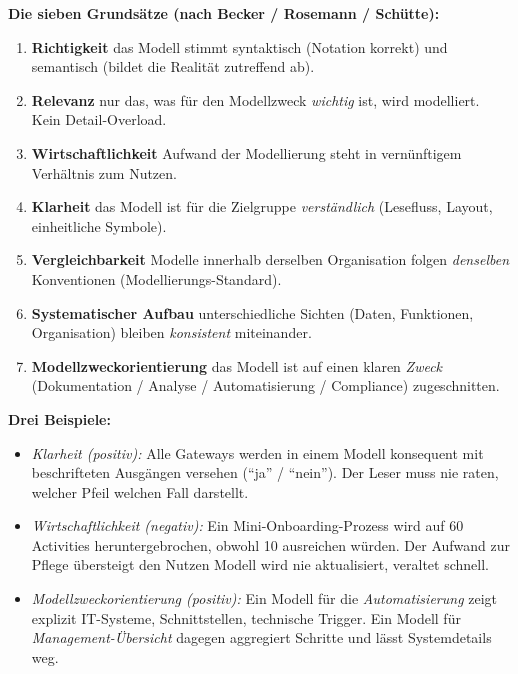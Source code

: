 \documentclass[11pt,a4paper,oneside]{article}
\begin{document}
\begin{loesungbox}
\textbf{Die sieben Grunds\"atze (nach Becker / Rosemann / Sch\"utte):}

\begin{enumerate}
  \item \textbf{Richtigkeit} \textendash{} das Modell stimmt syntaktisch (Notation korrekt) und semantisch (bildet die Realit\"at zutreffend ab).
  \item \textbf{Relevanz} \textendash{} nur das, was f\"ur den Modellzweck \emph{wichtig} ist, wird modelliert. Kein Detail-Overload.
  \item \textbf{Wirtschaftlichkeit} \textendash{} Aufwand der Modellierung steht in vern\"unftigem Verh\"altnis zum Nutzen.
  \item \textbf{Klarheit} \textendash{} das Modell ist f\"ur die Zielgruppe \emph{verst\"andlich} (Lesefluss, Layout, einheitliche Symbole).
  \item \textbf{Vergleichbarkeit} \textendash{} Modelle innerhalb derselben Organisation folgen \emph{denselben} Konventionen (Modellierungs-Standard).
  \item \textbf{Systematischer Aufbau} \textendash{} unterschiedliche Sichten (Daten, Funktionen, Organisation) bleiben \emph{konsistent} miteinander.
  \item \textbf{Modellzweckorientierung} \textendash{} das Modell ist auf einen klaren \emph{Zweck} (Dokumentation / Analyse / Automatisierung / Compliance) zugeschnitten.
\end{enumerate}

\smallskip
\textbf{Drei Beispiele:}

\begin{itemize}
  \item \emph{Klarheit (positiv):} Alle Gateways werden in einem Modell konsequent mit beschrifteten Ausg\"angen versehen (``ja'' / ``nein''). Der Leser muss nie raten, welcher Pfeil welchen Fall darstellt.
  \item \emph{Wirtschaftlichkeit (negativ):} Ein Mini-Onboarding-Prozess wird auf 60 Activities herunter\-gebrochen, obwohl 10 ausreichen w\"urden. Der Aufwand zur Pflege \"ubersteigt den Nutzen \textendash{} Modell wird nie aktualisiert, veraltet schnell.
  \item \emph{Modellzweckorientierung (positiv):} Ein Modell f\"ur die \emph{Automatisierung} zeigt explizit IT-Systeme, Schnittstellen, technische Trigger. Ein Modell f\"ur \emph{Management-\"Ubersicht} dagegen aggregiert Schritte und l\"asst Systemdetails weg.
\end{itemize}
\end{loesungbox}
\end{document}

